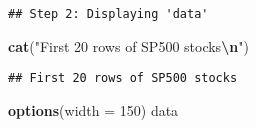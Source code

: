 \documentclass[
]{article}
\newenvironment{Shaded}{\begin{snugshade}}{\end{snugshade}}
\newcommand{\AttributeTok}[1]{\textcolor[rgb]{0.13,0.29,0.53}{#1}}
\newcommand{\DecValTok}[1]{\textcolor[rgb]{0.00,0.00,0.81}{#1}}
\newcommand{\FunctionTok}[1]{\textcolor[rgb]{0.13,0.29,0.53}{\textbf{#1}}}
\newcommand{\NormalTok}[1]{#1}
\newcommand{\SpecialCharTok}[1]{\textcolor[rgb]{0.81,0.36,0.00}{\textbf{#1}}}
\newcommand{\StringTok}[1]{\textcolor[rgb]{0.31,0.60,0.02}{#1}}
\begin{document}
\begin{verbatim}
## Step 2: Displaying 'data'
\end{verbatim}

\begin{Shaded}
\begin{Highlighting}[]
\FunctionTok{cat}\NormalTok{(}\StringTok{"First 20 rows of SP500 stocks}\SpecialCharTok{\textbackslash{}n}\StringTok{"}\NormalTok{)}
\end{Highlighting}
\end{Shaded}

\begin{verbatim}
## First 20 rows of SP500 stocks
\end{verbatim}

\begin{Shaded}
\begin{Highlighting}[]
\FunctionTok{options}\NormalTok{(}\AttributeTok{width =} \DecValTok{150}\NormalTok{)}
\NormalTok{data}
\end{Highlighting}
\end{Shaded}
\end{document}
